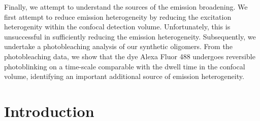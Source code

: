 Finally, we attempt to understand the sources of the emission broadening. We first attempt to reduce emission heterogeneity by reducing the excitation heterogenity within the confocal detection volume. Unfortunately, this is unsuccessful in sufficiently reducing the emission heterogeneity. Subsequently, we undertake a photobleaching analysis of our synthetic oligomers. From the photobleaching data, we show that the dye Alexa Fluor 488 undergoes reversible photoblinking on a time-scale comparable with the dwell time in the confocal volume, identifying an important additional source of emission heterogeneity.

%



\section{Introduction}
